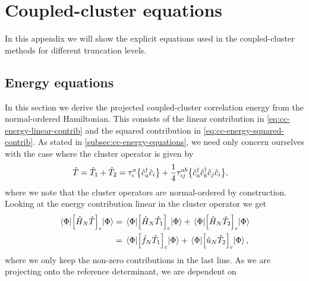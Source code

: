 \chapter{Coupled-cluster equations}
    In this appendix we will show the explicit equations used in the
    coupled-cluster methods for different truncation levels.

    \section{Energy equations}
        \label{app:cc-energy-equations}
        In this section we derive the projected coupled-cluster correlation
        energy from the normal-ordered Hamiltonian.
        This consists of the linear contribution in
        \autoref{eq:cc-energy-linear-contrib} and the squared contribution in
        \autoref{eq:cc-energy-squared-contrib}.
        As stated in \autoref{subsec:cc-energy-equations}, we need only concern
        ourselves with the case where the cluster operator is given by
        \begin{align}
            \hat{T}
            &= \hat{T}_1 + \hat{T}_2
            = \tau^{a}_{i}\bigl\{ \hat{c}_{a}^{\dagger}\hat{c}_{i} \bigr\}
            + \frac{1}{4}\tau^{ab}_{ij}
            \bigl\{ \hat{c}_{a}^{\dagger}\hat{c}_{b}^{\dagger}\hat{c}_{j}\hat{c}_{i} \bigr\},
        \end{align}
        where we note that the cluster operators are normal-ordered by
        construction.
        Looking at the energy contribution linear in the cluster operator we get
        \begin{align}
            \mel*{\Phi}{
                \left[ 
                    \hat{H}_N
                    \hat{T}
                 \right]_c
            }{\Phi}
            &=
            \mel*{\Phi}{
                \left[ 
                    \hat{H}_N
                    \hat{T}_1
                 \right]_c
            }{\Phi}
            + \mel*{\Phi}{
                \left[ 
                    \hat{H}_N
                    \hat{T}_2
                 \right]_c
            }{\Phi}
            \\
            &=
            \mel*{\Phi}{
                \left[ 
                    \hat{f}_N
                    \hat{T}_1
                 \right]_c
            }{\Phi}
            + \mel*{\Phi}{
                \left[ 
                    \hat{u}_N
                    \hat{T}_2
                 \right]_c
            }{\Phi},
        \end{align}
        where we only keep the non-zero contributions in the last line.
        As we are projecting onto the reference determinant, we are dependent on
